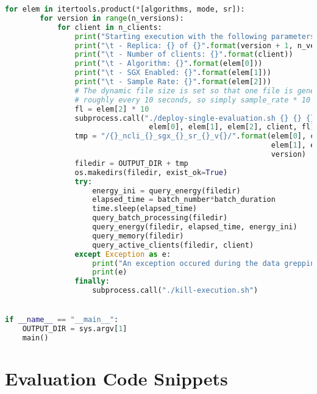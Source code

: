 \begin{lstlisting}[language=Python,caption={Benchmarking and Experiment Deployment Script.},label=code:deployment:experiments]
    for elem in itertools.product(*[algorithms, mode, sr]):
        for version in range(n_versions):
            for client in n_clients:
                print("Starting execution with the following parameters:")
                print("\t - Replica: {} of {}".format(version + 1, n_versions))
                print("\t - Number of clients: {}".format(client))
                print("\t - Algorithm: {}".format(elem[0]))
                print("\t - SGX Enabled: {}".format(elem[1]))
                print("\t - Sample Rate: {}".format(elem[2]))
                # The dynamic file size is set so that one file is generated
                # roughly every 10 seconds, so simply sample_rate * 10 lines.
                fl = elem[2] * 10
                subprocess.call("./deploy-single-evaluation.sh {} {} {} {} {}".format(
                                 elem[0], elem[1], elem[2], client, fl).split(" "))
                tmp = "/{}_ncli_{}_sgx_{}_sr_{}_v{}/".format(elem[0], client,
                                                             elem[1], elem[2],
                                                             version)
                filedir = OUTPUT_DIR + tmp
                os.makedirs(filedir, exist_ok=True)
                try:
                    energy_ini = query_energy(filedir)
                    elapsed_time = batch_number*batch_duration
                    time.sleep(elapsed_time)
                    query_batch_processing(filedir)
                    query_energy(filedir, elapsed_time, energy_ini)
                    query_memory(filedir)
                    query_active_clients(filedir, client)
                except Exception as e:
                    print("An exception occured during the data grepping!")
                    print(e)
                finally:
                    subprocess.call("./kill-execution.sh")


if __name__ == "__main__":
    OUTPUT_DIR = sys.argv[1]
    main()
\end{lstlisting}

\chapter{Evaluation Code Snippets} \label{chap:app:evaluation}

